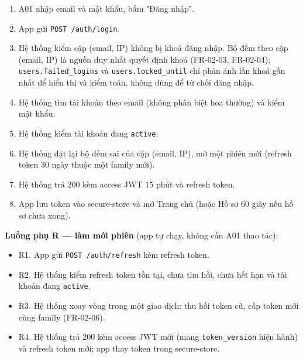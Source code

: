 \begin{enumerate}
\item A01 nhập email và mật khẩu, bấm "Đăng nhập".
\item App gửi {\small\texttt{POST /\allowbreak{}\allowbreak{}auth/\allowbreak{}\allowbreak{}login}}.
\item Hệ thống kiểm cặp (email, IP) không bị khoá đăng nhập. Bộ đếm theo cặp (email, IP) là nguồn duy nhất quyết định khoá (FR-\allowbreak{}02-\allowbreak{}03, FR-\allowbreak{}02-\allowbreak{}04); {\small\texttt{users.\allowbreak{}failed\_\allowbreak{}\allowbreak{}logins}} và {\small\texttt{users.\allowbreak{}locked\_\allowbreak{}\allowbreak{}until}} chỉ phản ánh lần khoá gần nhất để hiển thị và kiểm toán, không dùng để từ chối đăng nhập.
\item Hệ thống tìm tài khoản theo email (không phân biệt hoa thường) và kiểm mật khẩu.
\item Hệ thống kiểm tài khoản đang {\small\texttt{active}}.
\item Hệ thống đặt lại bộ đếm sai của cặp (email, IP), mở một phiên mới (refresh token 30 ngày thuộc một family mới).
\item Hệ thống trả 200 kèm access JWT 15 phút và refresh token.
\item App lưu token vào secure-\allowbreak{}store và mở Trang chủ (hoặc Hồ sơ 60 giây nếu hồ sơ chưa xong).
\end{enumerate}
\textbf{Luồng phụ R --- làm mới phiên} (app tự chạy, không cần A01 thao tác):

\begin{itemize}
\item R1. App gửi {\small\texttt{POST /\allowbreak{}\allowbreak{}auth/\allowbreak{}\allowbreak{}refresh}} kèm refresh token.
\item R2. Hệ thống kiểm refresh token tồn tại, chưa thu hồi, chưa hết hạn và tài khoản đang {\small\texttt{active}}.
\item R3. Hệ thống xoay vòng trong một giao dịch: thu hồi token cũ, cấp token mới cùng family (FR-\allowbreak{}02-\allowbreak{}06).
\item R4. Hệ thống trả 200 kèm access JWT mới (mang {\small\texttt{token\_\allowbreak{}\allowbreak{}version}} hiện hành) và refresh token mới; app thay token trong secure-\allowbreak{}store.
\end{itemize}
